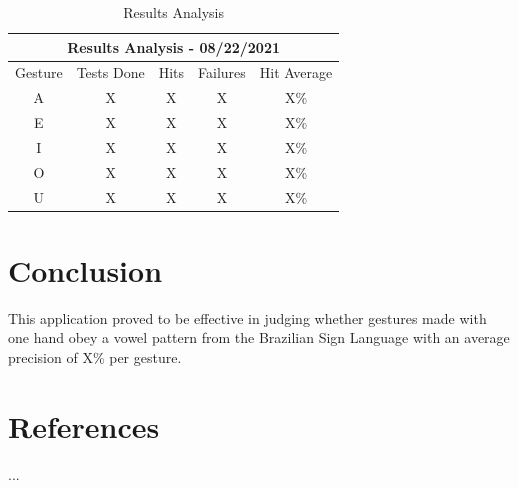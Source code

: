 \documentclass[a4paper, 12pt]{article}
\begin{document}
\begin{table}[h!]
    \centering
    \begin{tabular}{ |c|c|c|c|c| } 
    \hline
    \multicolumn{5}{|c|}{Results Analysis - 08/22/2021} \\
    \hline
    Gesture & Tests Done & Hits & Failures & Hit Average \\
    \hline
    A & X & X & X & X\% \\ 
    \hline
    E & X & X & X & X\% \\
    \hline
    I & X & X & X & X\% \\
    \hline
    O & X & X & X & X\% \\
    \hline
    U & X & X & X & X\% \\
    \hline
    \end{tabular}
    \caption{Results Analysis}
    \label{tab:results_analysis}
\end{table}


\section{Conclusion}

This application proved to be effective in judging whether gestures made with one hand obey a vowel pattern from the Brazilian Sign Language with an average precision of X\% per gesture.





\section{References}

...


\end{document}
